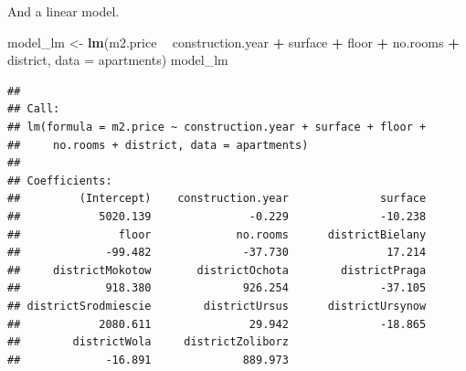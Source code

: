 \documentclass[]{book}
\newenvironment{Shaded}{\begin{snugshade}}{\end{snugshade}}
\newcommand{\DataTypeTok}[1]{\textcolor[rgb]{0.13,0.29,0.53}{#1}}
\newcommand{\KeywordTok}[1]{\textcolor[rgb]{0.13,0.29,0.53}{\textbf{#1}}}
\newcommand{\NormalTok}[1]{#1}
\newcommand{\OperatorTok}[1]{\textcolor[rgb]{0.81,0.36,0.00}{\textbf{#1}}}
\newcommand{\StringTok}[1]{\textcolor[rgb]{0.31,0.60,0.02}{#1}}
\theoremstyle{definition}
\theoremstyle{definition}
\theoremstyle{definition}
\theoremstyle{remark}
\begin{document}
And a linear model.

\begin{Shaded}
\begin{Highlighting}[]
\NormalTok{model_lm <-}\StringTok{ }\KeywordTok{lm}\NormalTok{(m2.price }\OperatorTok{~}\StringTok{ }\NormalTok{construction.year }\OperatorTok{+}\StringTok{ }\NormalTok{surface }\OperatorTok{+}\StringTok{ }\NormalTok{floor }\OperatorTok{+}\StringTok{ }\NormalTok{no.rooms }\OperatorTok{+}\StringTok{ }\NormalTok{district, }\DataTypeTok{data =}\NormalTok{ apartments)}
\NormalTok{model_lm}
\end{Highlighting}
\end{Shaded}

\begin{verbatim}
## 
## Call:
## lm(formula = m2.price ~ construction.year + surface + floor + 
##     no.rooms + district, data = apartments)
## 
## Coefficients:
##         (Intercept)    construction.year              surface  
##            5020.139               -0.229              -10.238  
##               floor             no.rooms      districtBielany  
##             -99.482              -37.730               17.214  
##     districtMokotow       districtOchota        districtPraga  
##             918.380              926.254              -37.105  
## districtSrodmiescie        districtUrsus      districtUrsynow  
##            2080.611               29.942              -18.865  
##        districtWola     districtZoliborz  
##             -16.891              889.973
\end{verbatim}


\end{document}
